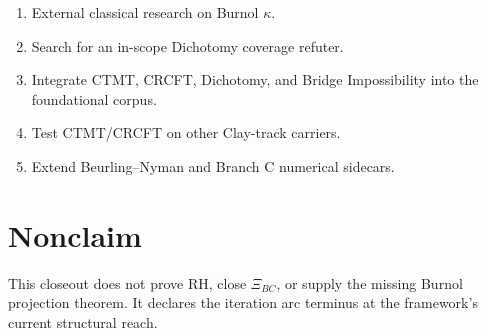\documentclass[11pt]{article}
\begin{document}
\begin{enumerate}
\item External classical research on Burnol \(\kappa\).
\item Search for an in-scope Dichotomy coverage refuter.
\item Integrate CTMT, CRCFT, Dichotomy, and Bridge Impossibility into the
foundational corpus.
\item Test CTMT/CRCFT on other Clay-track carriers.
\item Extend Beurling--Nyman and Branch C numerical sidecars.
\end{enumerate}

\section*{Nonclaim}

This closeout does not prove RH, close \(\Xi_{BC}\), or supply the missing
Burnol projection theorem.  It declares the iteration arc terminus at the
framework's current structural reach.
\end{document}
